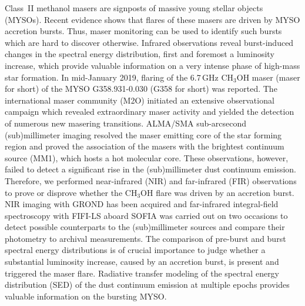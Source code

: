    \date{Received October 11, 2020; accepted YYYY ZZ, 2020}

 
  \abstract
    {
   Class~II methanol masers are signposts of massive young stellar objects (MYSOs). Recent evidence shows that flares of these masers are driven by MYSO accretion bursts. Thus, maser monitoring can be used to identify such bursts which are hard to discover otherwise. Infrared observations reveal burst-induced changes in the spectral energy distribution, first and foremost a luminosity increase, which provide valuable information on a very intense phase of high-mass star formation.
   }
   {
   In mid-January 2019, flaring of the 6.7\,GHz CH$_3$OH maser (maser for short) of the MYSO G358.931-0.030 (G358 for short) was reported. The international maser community (M2O) initiated an extensive observational campaign  which revealed extraordinary maser activity and yielded the detection of numerous new masering transitions. ALMA/SMA sub-arcsecond (sub)millimeter imaging resolved the maser emitting core of the  star forming region and proved the association of the masers with the brightest continuum source (MM1), which hosts a hot molecular core. These observations, however, failed to detect a significant rise in the (sub)millimeter dust continuum emission. Therefore, we performed near-infrared (NIR) and far-infrared (FIR) observations to prove or disprove whether the CH$_3$OH flare was driven by an accretion burst. 
   }
   {
    NIR imaging with GROND has been acquired and far-infrared integral-field spectroscopy with FIFI-LS aboard SOFIA was carried out on two occasions to detect possible counterparts to the (sub)millimeter sources and compare their photometry to archival measurements. The comparison of pre-burst and burst spectral energy distributions is of crucial importance to judge whether a substantial luminosity increase, caused by an accretion burst, is present and
    triggered the maser flare. Radiative transfer modeling of the 
    spectral energy distribution (SED) of the dust continuum emission at multiple epochs provides valuable information on the bursting MYSO.
   }
